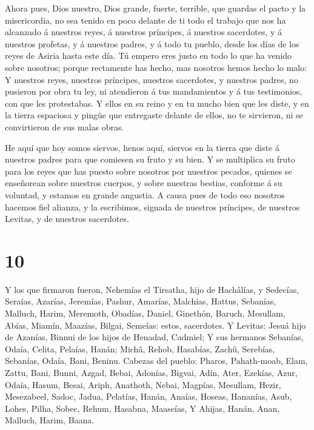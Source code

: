  Ahora pues, Dios nuestro, Dios grande, fuerte, terrible,
que guardas el pacto y la misericordia, no sea tenido en poco delante de
ti todo el trabajo que nos ha alcanzado á nuestros reyes, á nuestros
príncipes, á nuestros sacerdotes, y á nuestros profetas, y á nuestros
padres, y á todo tu pueblo, desde los días de los reyes de Asiria hasta
este día.  Tú empero eres justo en todo lo que ha venido
sobre nosotros; porque rectamente has hecho, mas nosotros hemos hecho lo
malo:  Y nuestros reyes, nuestros príncipes, nuestros
sacerdotes, y nuestros padres, no pusieron por obra tu ley, ni
atendieron á tus mandamientos y á tus testimonios, con que les
protestabas.  Y ellos en su reino y en tu mucho bien que
les diste, y en la tierra espaciosa y pingüe que entregaste delante de
ellos, no te sirvieron, ni se convirtieron de sus malas obras.

 He aquí que hoy somos siervos, henos aquí, siervos en la
tierra que diste á nuestros padres para que comiesen su fruto y su bien.
 Y se multiplica su fruto para los reyes que has puesto
sobre nosotros por nuestros pecados, quienes se enseñorean sobre
nuestros cuerpos, y sobre nuestras bestias, conforme á su voluntad, y
estamos en grande angustia.  A causa pues de todo eso
nosotros hacemos fiel alianza, y la escribimos, signada de nuestros
príncipes, de nuestros Levitas, y de nuestros sacerdotes.

\hypertarget{section-9}{%
\section{10}\label{section-9}}

 Y los que firmaron fueron, Nehemías el Tirsatha, hijo de
Hachâlías, y Sedecías,  Seraías, Azarías, Jeremías,
 Pashur, Amarías, Malchías,  Hattus, Sebanías,
Malluch,  Harim, Meremoth, Obadías,  Daniel,
Ginethón, Baruch,  Mesullam, Abías, Miamín, 
Maazías, Bilgai, Semeías: estos, sacerdotes.  Y Levitas:
Jesuá hijo de Azanías, Binnui de los hijos de Henadad, Cadmiel;
 Y sus hermanos Sebanías, Odaía, Celita, Pelaías, Hanán;
 Michâ, Rehob, Hasabías,  Zachû, Serebías,
Sebanías,  Odaía, Bani, Beninu.  Cabezas del
pueblo: Pharos, Pahath-moab, Elam, Zattu, Bani,  Bunni,
Azgad, Bebai,  Adonías, Bigvai, Adín,  Ater,
Ezekías, Azur,  Odaía, Hasum, Besai,  Ariph,
Anathoth, Nebai,  Magpías, Mesullam, Hezir, 
Mesezabeel, Sadoc, Jadua,  Pelatías, Hanán, Anaías,
 Hoseas, Hananías, Asub,  Lohes, Pilha, Sobec,
 Rehum, Hasabna, Maaseías,  Y Ahijas, Hanán,
Anan,  Malluch, Harim, Baana.

